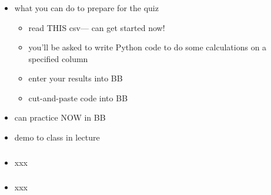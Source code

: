 \documentclass[english,14pt]{beamer}
\begin{document}
\begin{frame}[fragile]

\frametitle{}

\begin{itemize}
	\item what you can do to prepare for the quiz
	\begin{itemize}
		\item read THIS csv--- can get started now!
		\item you'll be asked to write Python code to do some calculations on a specified column
		\item enter your results into BB
		\item cut-and-paste code into BB
	\end{itemize}
	\item can practice NOW in BB
	\item demo to class in lecture
\end{itemize}

\end{frame}


\begin{frame}[fragile]

\frametitle{}

\begin{itemize}
	\item xxx
\end{itemize}

\end{frame}


\begin{frame}[fragile]

\frametitle{}

\begin{itemize}
	\item xxx
\end{itemize}

\end{frame}

\end{document}
